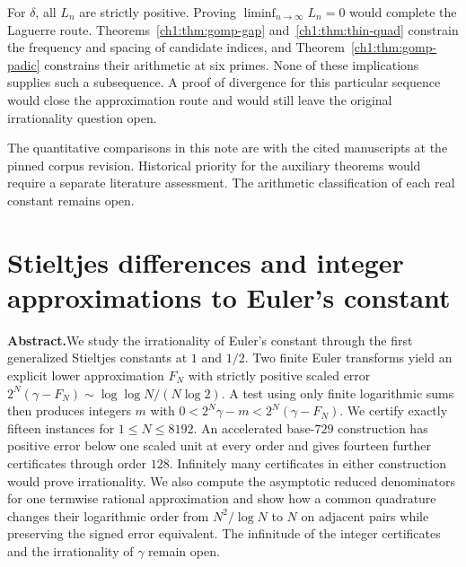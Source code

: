 \documentclass[11pt,a4paper,oneside,openany]{report}
\theoremstyle{remark}\newtheorem{remark}[theorem]{Remark}
\numberwithin{equation}{section}
\begin{document}
For $\delta$, all $L_n$ are strictly positive. Proving $\liminf_{n\to\infty}L_n=0$ would complete the Laguerre route. Theorems~\ref{ch1:thm:gomp-gap} and~\ref{ch1:thm:thin-quad} constrain the frequency and spacing of candidate indices, and Theorem~\ref{ch1:thm:gomp-padic} constrains their arithmetic at six primes. None of these implications supplies such a subsequence. A proof of divergence for this particular sequence would close the approximation route and would still leave the original irrationality question open.

The quantitative comparisons in this note are with the cited manuscripts at the pinned corpus revision. Historical priority for the auxiliary theorems would require a separate literature assessment. The arithmetic classification of each real constant remains open.

\chapter[Stieltjes differences and integer approximations]{Stieltjes differences and integer approximations to Euler's constant}\label{chap:2}
\noindent\textbf{Abstract.}\enspace We study the irrationality of Euler's constant through the first generalized Stieltjes constants at $1$ and $1/2$. Two finite Euler transforms yield an explicit lower approximation $F_N$ with strictly positive scaled error $2^N(\gamma-F_N)\sim\log\log N/(N\log2)$. A test using only finite logarithmic sums then produces integers $m$ with $0<2^N\gamma-m<2^N(\gamma-F_N)$. We certify exactly fifteen instances for $1\le N\le8192$. An accelerated base-$729$ construction has positive error below one scaled unit at every order and gives fourteen further certificates through order $128$. Infinitely many certificates in either construction would prove irrationality. We also compute the asymptotic reduced denominators for one termwise rational approximation and show how a common quadrature changes their logarithmic order from $N^2/\log N$ to $N$ on adjacent pairs while preserving the signed error equivalent. The infinitude of the integer certificates and the irrationality of $\gamma$ remain open.
\end{document}
